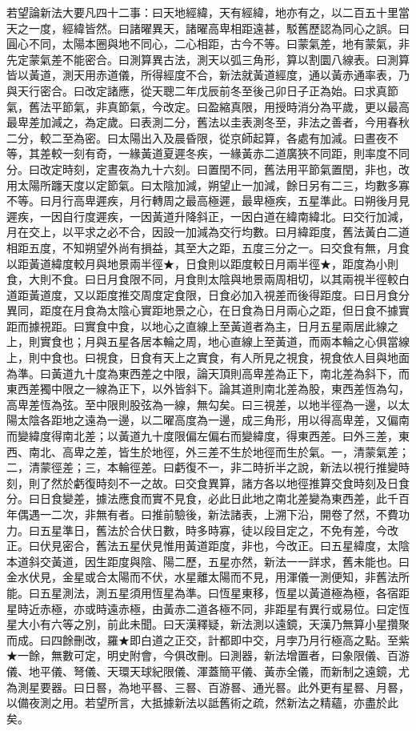 \begin{pinyinscope}
若望論新法大要凡四十二事：曰天地經緯，天有經緯，地亦有之，以二百五十里當天之一度，經緯皆然。曰諸曜異天，諸曜高卑相距遠甚，駁舊歷認為同心之誤。曰圓心不同，太陽本圈與地不同心，二心相距，古今不等。曰蒙氣差，地有蒙氣，非先定蒙氣差不能密合。曰測算異古法，測天以弧三角形，算以割圜八線表。曰測算皆以黃道，測天用赤道儀，所得經度不合，新法就黃道經度，通以黃赤通率表，乃與天行密合。曰改定諸應，從天聰二年戊辰前冬至後己卯日子正為始。曰求真節氣，舊法平節氣，非真節氣，今改定。曰盈縮真限，用授時消分為平歲，更以最高最卑差加減之，為定歲。曰表測二分，舊法以圭表測冬至，非法之善者，今用春秋二分，較二至為密。曰太陽出入及晨昏限，從京師起算，各處有加減。曰晝夜不等，其差較一刻有奇，一緣黃道夏遲冬疾，一緣黃赤二道廣狹不同距，則率度不同分。曰改定時刻，定晝夜為九十六刻。曰置閏不同，舊法用平節氣置閏，非也，改用太陽所躔天度以定節氣。曰太陰加減，朔望止一加減，餘日另有二三，均數多寡不等。曰月行高卑遲疾，月行轉周之最高極遲，最卑極疾，五星準此。曰朔後月見遲疾，一因自行度遲疾，一因黃道升降斜正，一因白道在緯南緯北。曰交行加減，月在交上，以平求之必不合，因設一加減為交行均數。曰月緯距度，舊法黃白二道相距五度，不知朔望外尚有損益，其至大之距，五度三分之一。曰交食有無，月食以距黃道緯度較月與地景兩半徑★，日食則以距度較日月兩半徑★，距度為小則食，大則不食。曰日月食限不同，月食則太陰與地景兩周相切，以其兩視半徑較白道距黃道度，又以距度推交周度定食限，日食必加入視差而後得距度。曰日月食分異同，距度在月食為太陰心實距地景之心，在日食為日月兩心之距，但日食不據實距而據視距。曰實食中食，以地心之直線上至黃道者為主，日月五星兩居此線之上，則實食也；月與五星各居本輪之周，地心直線上至黃道，而兩本輪之心俱當線上，則中食也。曰視食，日食有天上之實食，有人所見之視食，視食依人目與地面為準。曰黃道九十度為東西差之中限，論天頂則高卑差為正下，南北差為斜下，而東西差獨中限之一線為正下，以外皆斜下。論其道則南北差為股，東西差恆為勾，高卑差恆為弦。至中限則股弦為一線，無勾矣。曰三視差，以地半徑為一邊，以太陽太陰各距地之遠為一邊，以二曜高度為一邊，成三角形，用以得高卑差，又偏南而變緯度得南北差；以黃道九十度限偏左偏右而變緯度，得東西差。曰外三差，東西、南北、高卑之差，皆生於地徑，外三差不生於地徑而生於氣。一，清蒙氣差；二，清蒙徑差；三，本輪徑差。曰虧復不一，非二時折半之說，新法以視行推變時刻，則了然於虧復時刻不一之故。曰交食異算，諸方各以地徑推算交食時刻及日食分。曰日食變差，據法應食而實不見食，必此日此地之南北差變為東西差，此千百年偶遇一二次，非無有者。曰推前驗後，新法諸表，上溯下沿，開卷了然，不費功力。曰五星準日，舊法於合伏日數，時多時寡，徒以段目定之，不免有差，今改正。曰伏見密合，舊法五星伏見惟用黃道距度，非也，今改正。曰五星緯度，太陰本道斜交黃道，因生距度與陰、陽二歷，五星亦然，新法一一詳求，舊未能也。曰金水伏見，金星或合太陽而不伏，水星離太陽而不見，用渾儀一測便知，非舊法所能。曰五星測法，測五星須用恆星為準。曰恆星東移，恆星以黃道極為極，各宿距星時近赤極，亦或時遠赤極，由黃赤二道各極不同，非距星有異行或易位。曰定恆星大小有六等之別，前此未聞。曰天漢釋疑，新法測以遠鏡，天漢乃無算小星攢聚而成。曰四餘刪改，羅★即白道之正交，計都即中交，月孛乃月行極高之點。至紫★一餘，無數可定，明史附會，今俱改刪。曰測器，新法增置者，曰象限儀、百游儀、地平儀、弩儀、天環天球紀限儀、渾蓋簡平儀、黃赤全儀，而新制之遠鏡，尤為測星要器。曰日晷，為地平晷、三晷、百游晷、通光晷。此外更有星晷、月晷，以備夜測之用。若望所言，大抵據新法以詆舊術之疏，然新法之精蘊，亦盡於此矣。


\end{pinyinscope}
